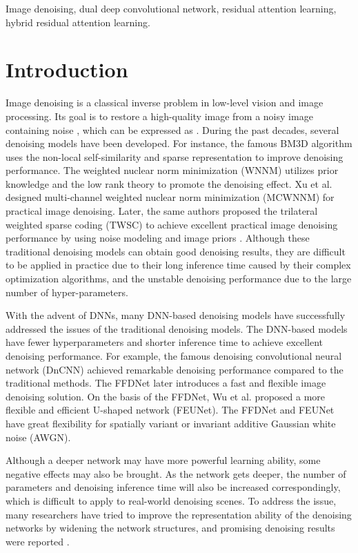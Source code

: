 \documentclass[3p,times]{elsarticle}
\begin{document}
\begin{frontmatter}
\begin{keyword}
Image denoising, dual deep convolutional network, residual attention learning, hybrid residual attention learning.
\end{keyword}

\end{frontmatter}

\section{Introduction}
Image denoising is a classical inverse problem in low-level vision and image processing. Its goal is to restore a high-quality image  from a noisy image  containing noise , which can be expressed as . During the past decades, several denoising models have been developed. For instance, the famous BM3D algorithm \cite{Dabov2007} uses the non-local self-similarity and sparse representation to improve denoising performance. The weighted nuclear norm minimization (WNNM) \cite{Gu2014} utilizes prior knowledge and the low rank theory to promote the denoising effect. Xu et al. \cite{Xu2017} designed multi-channel weighted nuclear norm minimization (MCWNNM) for practical image denoising. Later, the same authors proposed the trilateral weighted sparse coding (TWSC) to achieve excellent practical image denoising performance by using noise modeling and image priors \cite{Xu2018}. Although these traditional denoising models can obtain good denoising results, they are difficult to be applied in practice due to their long inference time caused by their complex optimization algorithms, and the unstable denoising performance due to the large number of hyper-parameters.

With the advent of DNNs, many DNN-based denoising models have successfully addressed the issues of the traditional denoising models. The DNN-based models have fewer hyperparameters and shorter inference time to achieve excellent denoising performance. For example, the famous denoising convolutional neural network (DnCNN) \cite{Zhang2017} achieved remarkable denoising performance compared to the traditional methods. The FFDNet \cite{Zhang2018} later introduces a fast and flexible image denoising solution. On the basis of the FFDNet, Wu et al. \cite{Wu2023} proposed a more flexible and efficient U-shaped network (FEUNet). The FFDNet and FEUNet have great flexibility for spatially variant or invariant additive Gaussian white noise (AWGN).

Although a deeper network may have more powerful learning ability, some negative effects may also be brought. As the network gets deeper, the number of parameters and denoising inference time will also be increased correspondingly, which is difficult to apply to real-world denoising scenes. To address the issue, many researchers have tried to improve the representation ability of the denoising networks by widening the network structures, and promising denoising results were reported \cite{Pan2018, Tian2020, Tian2021}.
\end{document}
